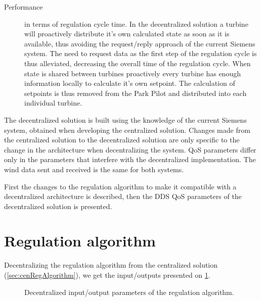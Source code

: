 \begin{description}
	\item[Performance] in terms of regulation cycle time. In the decentralized solution a turbine will proactively distribute it's own calculated state as soon as it is available, thus avoiding the request/reply approach of the current Siemens system. The need to request data as the first step of the regulation cycle is thus alleviated, decreasing the overall time of the regulation cycle. When state is shared between turbines proactively every turbine has enough information locally to calculate it's own setpoint. The calculation of setpoints is thus removed from the Park Pilot and distributed into each individual turbine. 
\end{description}


\noindent The decentralized solution is built using the knowledge of the current Siemens system, obtained when developing the centralized solution. Changes made from the centralized solution to the decentralized solution are only specific to the change in the architecture when decentralizing the system. QoS parameters differ only in the parameters that interfere with the decentralized implementation. The wind data sent and received is the same for both systems.

First the changes to the regulation algorithm to make it compatible with a decentralized architecture is described, then the DDS QoS parameters of the decentralized solution is presented.

\section{Regulation algorithm}

Decentralizing the regulation algorithm from the centralized solution (\cref{sec:cenRegAlgorithm}), we get the input/outputs presented on \cref{fig:ioDecenRegAlg}.

\begin{figure}[!h]
	\centering
	

	\caption[Decentralized input/output parameters of the regulation algorithm]{
		\label{fig:ioDecenRegAlg} 
		\footnotesize{%
			Decentralized input/output parameters of the regulation algorithm.
		}
	}
\end{figure}

